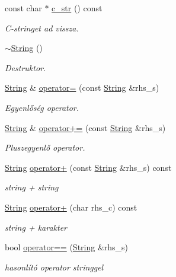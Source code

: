 \begin{DoxyCompactItemize}
const char $\ast$ \mbox{\hyperlink{class_string_a0274f3e61533d15086816fb7f47ccb54}{c\+\_\+str}} () const
\begin{DoxyCompactList}\small\item\em C-\/stringet ad vissza. \end{DoxyCompactList}\item 
\mbox{\hyperlink{class_string_ac40b2a3fb58c2d8556f5e6ff73510036}{$\sim$\+String}} ()
\begin{DoxyCompactList}\small\item\em Destruktor. \end{DoxyCompactList}\item 
\mbox{\hyperlink{class_string}{String}} \& \mbox{\hyperlink{class_string_a803e6112834d4c0cdb0da6c6a4000e6e}{operator=}} (const \mbox{\hyperlink{class_string}{String}} \&rhs\+\_\+s)
\begin{DoxyCompactList}\small\item\em Egyenlőség operator. \end{DoxyCompactList}\item 
\mbox{\hyperlink{class_string}{String}} \& \mbox{\hyperlink{class_string_ac203e7c52e04bb86f62f9dd75527b361}{operator+=}} (const \mbox{\hyperlink{class_string}{String}} \&rhs\+\_\+s)
\begin{DoxyCompactList}\small\item\em Pluszegyenlő operator. \end{DoxyCompactList}\item 
\mbox{\hyperlink{class_string}{String}} \mbox{\hyperlink{class_string_a28a020f061e5f25317af47488bfb7de8}{operator+}} (const \mbox{\hyperlink{class_string}{String}} \&rhs\+\_\+s) const
\begin{DoxyCompactList}\small\item\em string + string \end{DoxyCompactList}\item 
\mbox{\hyperlink{class_string}{String}} \mbox{\hyperlink{class_string_abb187e5ab66fe29c42aed4845b55dd76}{operator+}} (char rhs\+\_\+c) const
\begin{DoxyCompactList}\small\item\em string + karakter \end{DoxyCompactList}\item 
bool \mbox{\hyperlink{class_string_a1006dbb8a123aed87b8edb33d5cbcee4}{operator==}} (\mbox{\hyperlink{class_string}{String}} \&rhs\+\_\+s)
\begin{DoxyCompactList}\small\item\em hasonlító operator stringgel \end{DoxyCompactList}\item 

\end{DoxyCompactItemize}
